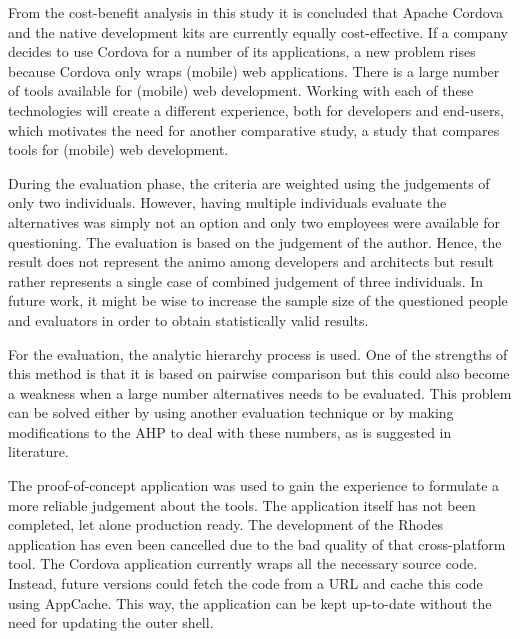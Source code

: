 From the cost-benefit analysis in this study it is concluded that Apache Cordova and the native development kits are currently equally cost-effective. If a company decides to use Cordova for a number of its applications, a new problem rises because Cordova only wraps (mobile) web applications. There is a large number of tools available for (mobile) web development. Working with each of these technologies will create a different experience, both for developers and end-users, which motivates the need for another comparative study, a study that compares tools for (mobile) web development. 

During the evaluation phase, the criteria are weighted using the judgements of only two individuals. However, having multiple individuals evaluate the alternatives was simply not an option and only two employees were available for questioning. The evaluation is based on the judgement of the author. Hence, the result does not represent the animo among developers and architects but result rather represents a single case of combined judgement of three individuals. In future work, it might be wise to increase the sample size of the questioned people and evaluators in order to obtain statistically valid results. 

For the evaluation, the analytic hierarchy process is used. One of the strengths of this method is that it is based on pairwise comparison but this could also become a weakness when a large number alternatives needs to be evaluated. This problem can be solved either by using another evaluation technique or by making modifications to the AHP to deal with these numbers, as is suggested in literature.

The proof-of-concept application was used to gain the experience to formulate a more reliable judgement about the tools. The application itself has not been completed, let alone production ready. The development of the Rhodes application has even been cancelled due to the bad quality of that cross-platform tool. The Cordova application currently wraps all the necessary source code. Instead, future versions could fetch the code from a URL and cache this code using AppCache. This way, the application can be kept up-to-date without the need for updating the outer shell.




